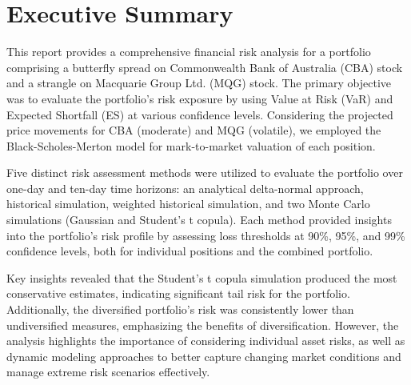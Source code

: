 \section{Executive Summary}
This report provides a comprehensive financial risk analysis for a portfolio comprising a butterfly spread on Commonwealth Bank of Australia (CBA) stock and a strangle on Macquarie Group Ltd. (MQG) stock. The primary objective was to evaluate the portfolio's risk exposure by using Value at Risk (VaR) and Expected Shortfall (ES) at various confidence levels. Considering the projected price movements for CBA (moderate) and MQG (volatile), we employed the Black-Scholes-Merton model for mark-to-market valuation of each position.

Five distinct risk assessment methods were utilized to evaluate the portfolio over one-day and ten-day time horizons: an analytical delta-normal approach, historical simulation, weighted historical simulation, and two Monte Carlo simulations (Gaussian and Student's t copula). Each method provided insights into the portfolio’s risk profile by assessing loss thresholds at 90\%, 95\%, and 99\% confidence levels, both for individual positions and the combined portfolio.

Key insights revealed that the Student’s t copula simulation produced the most conservative estimates, indicating significant tail risk for the portfolio. Additionally, the diversified portfolio's risk was consistently lower than undiversified measures, emphasizing the benefits of diversification. However, the analysis highlights the importance of considering individual asset risks, as well as dynamic modeling approaches to better capture changing market conditions and manage extreme risk scenarios effectively.